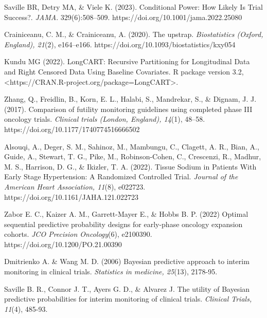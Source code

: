 \documentclass[Afour,sageh,times,square,numbers]{sagej}
\begin{document}
\begin{thebibliography}{99}
Saville BR, Detry MA, \& Viele K. (2023). Conditional Power: How Likely Is Trial Success?. \textit{JAMA}. 329(6):508–509. https://doi.org/10.1001/jama.2022.25080

Crainiceanu, C. M., \& Crainiceanu, A. (2020). The upstrap. \textit{Biostatistics (Oxford, England), 21}(2), e164–e166. https://doi.org/10.1093/biostatistics/kxy054

Kundu MG (2022). LongCART: Recursive Partitioning for Longitudinal Data and Right Censored Data Using Baseline Covariates. R package version 3.2, <https://CRAN.R-project.org/package=LongCART>.

Zhang, Q., Freidlin, B., Korn, E. L., Halabi, S., Mandrekar, S., \& Dignam, J. J. (2017). Comparison of futility monitoring guidelines using completed phase III oncology trials. \textit{Clinical trials (London, England), 14}(1), 48–58. https://doi.org/10.1177/1740774516666502

Alsouqi, A., Deger, S. M., Sahinoz, M., Mambungu, C., Clagett, A. R., Bian, A., Guide, A., Stewart, T. G., Pike, M., Robinson-Cohen, C., Crescenzi, R., Madhur, M. S., Harrison, D. G., \& Ikizler, T. A. (2022). Tissue Sodium in Patients With Early Stage Hypertension: A Randomized Controlled Trial. \textit{Journal of the American Heart Association, 11}(8), e022723. https://doi.org/10.1161/JAHA.121.022723

Zabor E. C., Kaizer A. M., Garrett-Mayer E., \& Hobbs B. P. (2022) Optimal sequential predictive probability designs for early-phase oncology expansion cohorts. \textit{JCO Precision Oncology}(6), e2100390. https://doi.org/10.1200/PO.21.00390

Dmitrienko A. \& Wang M. D. (2006) Bayesian predictive approach to interim monitoring in clinical trials. \textit{Statistics in medicine, 25}(13), 2178-95.

Saville B. R., Connor J. T., Ayers G. D., \& Alvarez J. The utility of Bayesian predictive probabilities for interim monitoring of clinical trials. \textit{Clinical Trials, 11}(4), 485-93.

\end{thebibliography}


\newpage
\onecolumn
\end{document}
